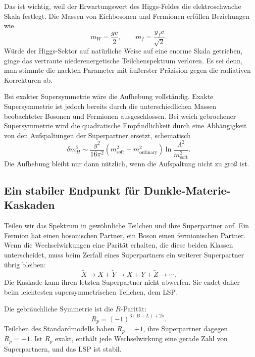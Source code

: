 Das ist wichtig, weil der Erwartungswert des Higgs-Feldes die elektroschwache Skala festlegt. Die Massen von Eichbosonen und Fermionen erfüllen Beziehungen wie
\begin{equation}
m_W=\frac{gv}{2},
\qquad
m_f=\frac{y_fv}{\sqrt2}.
\end{equation}
Würde der Higgs-Sektor auf natürliche Weise auf eine enorme Skala getrieben, ginge das vertraute niederenergetische Teilchenspektrum verloren. Es sei denn, man stimmte die nackten Parameter mit äußerster Präzision gegen die radiativen Korrekturen ab.

Bei exakter Supersymmetrie wäre die Aufhebung vollständig. Exakte Supersymmetrie ist jedoch bereits durch die unterschiedlichen Massen beobachteter Bosonen und Fermionen ausgeschlossen. Bei weich gebrochener Supersymmetrie wird die quadratische Empfindlichkeit durch eine Abhängigkeit von den Aufspaltungen der Superpartner ersetzt, schematisch
\begin{equation}
\delta m_H^2
\sim
\frac{g^2}{16\pi^2}
\left(m_{\mathrm{soft}}^2-m_{\mathrm{ordinary}}^2\right)
\ln\frac{\Lambda^2}{m_{\mathrm{soft}}^2}.
\end{equation}
Die Aufhebung bleibt nur dann nützlich, wenn die Aufspaltung nicht zu groß ist.

\subsection{Ein stabiler Endpunkt für Dunkle-Materie-Kaskaden}

Teilen wir das Spektrum in gewöhnliche Teilchen und ihre Superpartner auf. Ein Fermion hat einen bosonischen Partner, ein Boson einen fermionischen Partner. Wenn die Wechselwirkungen eine Parität erhalten, die diese beiden Klassen unterscheidet, muss beim Zerfall eines Superpartners ein weiterer Superpartner übrig bleiben:
\begin{equation}
\widetilde X
\longrightarrow X+\widetilde Y
\longrightarrow X+Y+\widetilde Z
\longrightarrow\cdots.
\end{equation}
Die Kaskade kann ihren letzten Superpartner nicht abwerfen. Sie endet daher beim leichtesten supersymmetrischen Teilchen, dem LSP.

Die gebräuchliche Symmetrie ist die \(R\)-Parität:
\begin{equation}
R_p=(-1)^{3(B-L)+2s}.
\end{equation}
Teilchen des Standardmodells haben \(R_p=+1\), ihre Superpartner dagegen \(R_p=-1\). Ist \(R_p\) exakt, enthält jede Wechselwirkung eine gerade Zahl von Superpartnern, und das LSP ist stabil.

